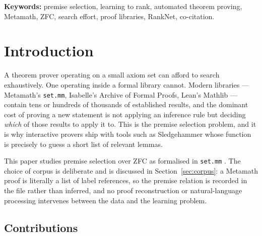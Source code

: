 \documentclass[11pt]{article}
\theoremstyle{plain}
\theoremstyle{definition}
\theoremstyle{remark}
\begin{document}
\medskip
\noindent\textbf{Keywords:} premise selection, learning to rank, automated
theorem proving, Metamath, ZFC, search effort, proof libraries, RankNet,
co-citation.

\newpage
\tableofcontents
\newpage

\section{Introduction}\label{sec:intro}

A theorem prover operating on a small axiom set can afford to search
exhaustively. One operating inside a formal library cannot. Modern libraries ---
Metamath's \texttt{set.mm}, Isabelle's Archive of Formal Proofs, Lean's Mathlib
--- contain tens or hundreds of thousands of established results, and the
dominant cost of proving a new statement is not applying an inference rule but
deciding \emph{which} of those results to apply it to. This is the premise
selection problem, and it is why interactive provers ship with tools such as
Sledgehammer \cite{sledgehammer} whose function is precisely to guess a short
list of relevant lemmas.

This paper studies premise selection over ZFC as formalised in \texttt{set.mm}
\cite{megill}. The choice of corpus is deliberate and is discussed in
Section~\ref{sec:corpus}: a Metamath proof is literally a list of label
references, so the premise relation is recorded in the file rather than inferred,
and no proof reconstruction or natural-language processing intervenes between the
data and the learning problem.

\subsection{Contributions}
\end{document}
